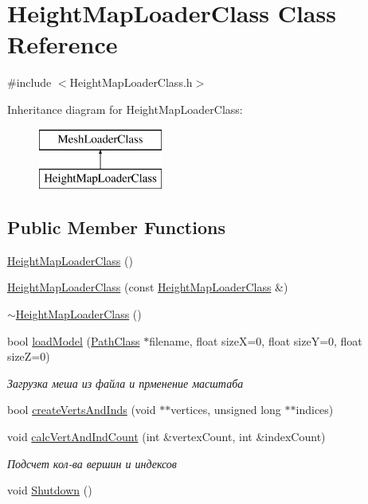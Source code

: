 \hypertarget{class_height_map_loader_class}{}\section{Height\+Map\+Loader\+Class Class Reference}
\label{class_height_map_loader_class}


{\ttfamily \#include $<$Height\+Map\+Loader\+Class.\+h$>$}

Inheritance diagram for Height\+Map\+Loader\+Class\+:\begin{figure}[H]
\begin{center}
\leavevmode
\includegraphics[height=2.000000cm]{class_height_map_loader_class}
\end{center}
\end{figure}
\subsection*{Public Member Functions}
\begin{DoxyCompactItemize}
\item 
\hyperlink{class_height_map_loader_class_a23d62d515602dca8fbaf826704e4d479}{Height\+Map\+Loader\+Class} ()
\item 
\hyperlink{class_height_map_loader_class_a6efab3bc5ca2feb5bc1f250eb22ceeeb}{Height\+Map\+Loader\+Class} (const \hyperlink{class_height_map_loader_class}{Height\+Map\+Loader\+Class} \&)
\item 
\hyperlink{class_height_map_loader_class_ac99f21f7ee38e388974bfd710d800ea0}{$\sim$\+Height\+Map\+Loader\+Class} ()
\item 
bool \hyperlink{class_height_map_loader_class_a9b6d6734cb3121838708ca16e24a8d3c}{load\+Model} (\hyperlink{class_path_class}{Path\+Class} $\ast$filename, float sizeX=0, float sizeY=0, float sizeZ=0)
\begin{DoxyCompactList}\small\item\em Загрузка меша из файла и прменение масштаба \end{DoxyCompactList}\item 
bool \hyperlink{class_height_map_loader_class_a998e195c69462da5cf46307e14ee976a}{create\+Verts\+And\+Inds} (void $\ast$$\ast$vertices, unsigned long $\ast$$\ast$indices)
\item 
void \hyperlink{class_height_map_loader_class_adb0bc9eb87f5bcfd376ccc2d2e0f8220}{calc\+Vert\+And\+Ind\+Count} (int \&vertex\+Count, int \&index\+Count)
\begin{DoxyCompactList}\small\item\em Подсчет кол-\/ва вершин и индексов \end{DoxyCompactList}\item 
void \hyperlink{class_height_map_loader_class_a7d0685c6784bb9c525085a87fcecae0b}{Shutdown} ()
\end{DoxyCompactItemize}
